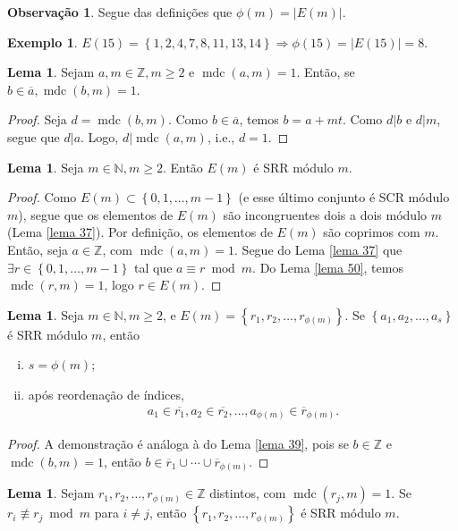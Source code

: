 \documentclass[a4paper,11pt,twoside, leqno]{article}
\DeclareMathOperator{\mdc}{mdc}
\theoremstyle{definition}
\newtheorem{lemma}[theorem]{Lema}
\newtheorem{remark}{Observação}[section]
\newtheorem*{example}{Exemplo}
\begin{document}
\begin{remark}
	Segue das definições que $\phi(m) = |E(m)|$.
\end{remark}
\begin{example}
	$E(15) = \left\{ 1,2,4,7,8,11,13,14 \right\}\Rightarrow \phi(15) = |E(15)| = 8$.
\end{example}
\begin{lemma}
	\label{lema 50}
	Sejam $a,m\in\mathbb{Z}, m\geq 2$ e $\mdc(a,m) = 1$. Então, se $b\in\overline{a}, \mdc(b,m) = 1$.
\end{lemma}
\begin{proof}
	Seja $d = \mdc(b,m)$. Como $b\in\overline{a}$, temos $b = a+mt$. Como $d|b$ e $d|m$, segue que $d|a$. Logo, $d|\mdc(a,m)$, i.e., $d=1$.
\end{proof}
\begin{lemma}
	\label{lema 51}
	Seja $m\in\mathbb{N}, m\geq 2$. Então $E(m)$ é SRR módulo $m$.
\end{lemma}
\begin{proof}
	Como $E(m)\subset \left\{ 0,1,\dots,m-1 \right\}$ (e esse último conjunto é SCR módulo $m$), segue que os elementos de $E(m)$ são incongruentes dois a dois módulo $m$ (Lema \eqref{lema 37}). Por definição, os elementos de $E(m)$ são coprimos com $m$. Então, seja $a\in\mathbb{Z}$, com $\mdc(a,m) = 1$. Segue do Lema \eqref{lema 37} que $\exists r\in\left\{ 0,1,\dots,m-1 \right\}$ tal que $a\equiv r\bmod m$. Do Lema \eqref{lema 50}, temos $\mdc(r,m) = 1$, logo $r\in E(m)$.
\end{proof}
\begin{lemma}
	\label{lema 52}
	Seja $m\in\mathbb{N}, m\geq 2$, e $E(m) = \left\{ r_1, r_2, \dots, r_{\phi(m)} \right\}$. Se $\left\{ a_1, a_2, \dots, a_s \right\}$ é SRR módulo $m$, então
	\begin{enumerate}[(i)]
		\item $s=\phi(m)$;
		\item após reordenação de índices,
		\begin{align*}
		a_1\in\overline{r_1}, a_2\in\overline{r_2}, \dots, a_{\phi(m)}\in\overline{r}_{\phi(m)}.
		\end{align*}
	\end{enumerate}
\end{lemma}
\begin{proof}
	A demonstração é análoga à do Lema \eqref{lema 39}, pois se $b\in\mathbb{Z}$ e $\mdc(b,m) = 1$, então $b\in\overline{r}_1\cup\cdots\cup\overline{r}_{\phi(m)}$.
\end{proof}
\begin{lemma}
	\label{lema 53}
	Sejam $r_1, r_2, \dots, r_{\phi(m)}\in\mathbb{Z}$ distintos, com $\mdc(r_j,m) = 1$. Se $r_i\not\equiv r_j\bmod m$ para $i\neq j$, então $\left\{ r_1, r_2, \dots, r_{\phi(m)} \right\}$ é SRR módulo $m$.
\end{lemma}
\end{document}
